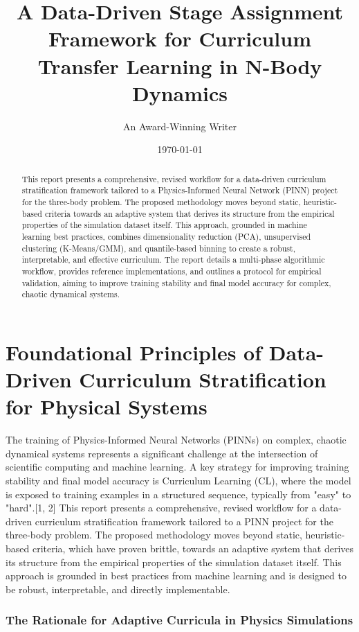 \documentclass[11pt, letterpaper]{article}
\title{A Data-Driven Stage Assignment Framework for Curriculum Transfer Learning in N-Body Dynamics}
\author{An Award-Winning Writer}
\date{\today}
\begin{document}
\maketitle
\begin{abstract}
This report presents a comprehensive, revised workflow for a data-driven curriculum stratification framework tailored to a Physics-Informed Neural Network (PINN) project for the three-body problem. The proposed methodology moves beyond static, heuristic-based criteria towards an adaptive system that derives its structure from the empirical properties of the simulation dataset itself. This approach, grounded in machine learning best practices, combines dimensionality reduction (PCA), unsupervised clustering (K-Means/GMM), and quantile-based binning to create a robust, interpretable, and effective curriculum. The report details a multi-phase algorithmic workflow, provides reference implementations, and outlines a protocol for empirical validation, aiming to improve training stability and final model accuracy for complex, chaotic dynamical systems.
\end{abstract}

\tableofcontents
\newpage

\part{Foundational Principles of Data-Driven Curriculum Stratification for Physical Systems}

The training of Physics-Informed Neural Networks (PINNs) on complex, chaotic dynamical systems represents a significant challenge at the intersection of scientific computing and machine learning. A key strategy for improving training stability and final model accuracy is Curriculum Learning (CL), where the model is exposed to training examples in a structured sequence, typically from "easy" to "hard".[1, 2] This report presents a comprehensive, revised workflow for a data-driven curriculum stratification framework tailored to a PINN project for the three-body problem. The proposed methodology moves beyond static, heuristic-based criteria, which have proven brittle, towards an adaptive system that derives its structure from the empirical properties of the simulation dataset itself. This approach is grounded in best practices from machine learning and is designed to be robust, interpretable, and directly implementable.

\section{The Rationale for Adaptive Curricula in Physics Simulations}
\end{document}
